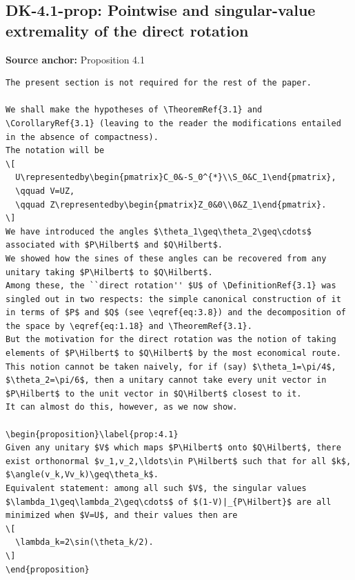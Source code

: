 \subsection*{DK-4.1-prop: Pointwise and singular-value extremality of the direct rotation}
\noindent\textbf{Source anchor:} Proposition 4.1\\
\begin{verbatim}
The present section is not required for the rest of the paper.

We shall make the hypotheses of \TheoremRef{3.1} and \CorollaryRef{3.1} (leaving to the reader the modifications entailed in the absence of compactness).
The notation will be
\[
  U\representedby\begin{pmatrix}C_0&-S_0^{*}\\S_0&C_1\end{pmatrix},
  \qquad V=UZ,
  \qquad Z\representedby\begin{pmatrix}Z_0&0\\0&Z_1\end{pmatrix}.
\]
We have introduced the angles $\theta_1\geq\theta_2\geq\cdots$ associated with $P\Hilbert$ and $Q\Hilbert$.
We showed how the sines of these angles can be recovered from any unitary taking $P\Hilbert$ to $Q\Hilbert$.
Among these, the ``direct rotation'' $U$ of \DefinitionRef{3.1} was singled out in two respects: the simple canonical construction of it in terms of $P$ and $Q$ (see \eqref{eq:3.8}) and the decomposition of the space by \eqref{eq:1.18} and \TheoremRef{3.1}.
But the motivation for the direct rotation was the notion of taking elements of $P\Hilbert$ to $Q\Hilbert$ by the most economical route.
This notion cannot be taken naively, for if (say) $\theta_1=\pi/4$, $\theta_2=\pi/6$, then a unitary cannot take every unit vector in $P\Hilbert$ to the unit vector in $Q\Hilbert$ closest to it.
It can almost do this, however, as we now show.

\begin{proposition}\label{prop:4.1}
Given any unitary $V$ which maps $P\Hilbert$ onto $Q\Hilbert$, there exist orthonormal $v_1,v_2,\ldots\in P\Hilbert$ such that for all $k$, $\angle(v_k,Vv_k)\geq\theta_k$.
Equivalent statement: among all such $V$, the singular values $\lambda_1\geq\lambda_2\geq\cdots$ of $(1-V)|_{P\Hilbert}$ are all minimized when $V=U$, and their values then are
\[
  \lambda_k=2\sin(\theta_k/2).
\]
\end{proposition}
\end{verbatim}

